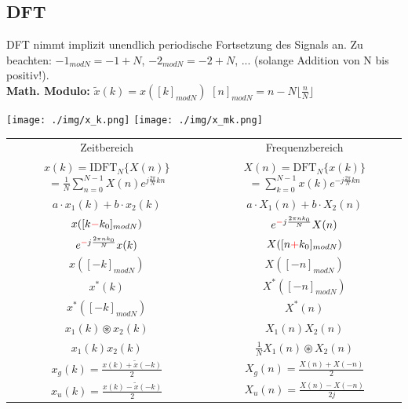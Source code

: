 \documentclass[10pt,a4paper]{article}
\begin{document}
\subsection{DFT}
DFT nimmt implizit unendlich periodische Fortsetzung des Signals an. Zu beachten: $-1_{modN}=-1 + N$, $-2_{modN}=-2+N$, ... (solange Addition von N bis positiv!).\\
\textbf{Math. Modulo:}
$\tilde{x}(k) = x([k]_{modN})$ 
$[n]_{modN}=n-N \lfloor \frac{n}{N} \rfloor$
  \begin{center}
      \texttt{[image: ./img/x\_k.png]}
      \texttt{[image: ./img/x\_mk.png]}
  \end{center}

\begin{center}
  \bgroup
  \def\arraystretch{1.5}
  \begin{tabular}{ | c | c | }
  \cline{1-2}
          \rowcolor{black!15}
          Zeitbereich & Frequenzbereich \\
  
  \cline{1-2}
          \shortstack{$x(k)=\text{IDFT}_N\{X(n)\}$ \\ $=\frac{1}{N}\displaystyle\sum\limits_{n=0}^{N-1}X(n)e^{j\frac{2\pi}{N}kn}$} &
          \shortstack{$X(n)=\text{DFT}_N\{x(k)\}$ \\ $=\displaystyle\sum\limits_{k=0}^{N-1}x(k)e^{-j\frac{2\pi}{N}kn}$} \\

  \cline{1-2}
          $a\cdot x_1(k)+ b\cdot x_2(k)$ & $a\cdot X_1(n) +b\cdot X_2(n)$ \\
  \cline{1-2}
          $x([k\textcolor{red}{-}k_0]_{modN})$ & $e^{\textcolor{red}{-}j\frac{2\pi nk_0}{N}} X(n)$\\
  \cline{1-2}
          $e^{\textcolor{red}{-}j\frac{2\pi nk_0}{N}} x(k)$ & $X([n\textcolor{red}{+}k_0]_{modN})$ \\  
  \cline{1-2}
          $x([-k]_{modN})$ & $X([-n]_{modN})$ \\  
  \cline{1-2}
          $x^*(k)$& $X^*([-n]_{modN})$\\ 
  \cline{1-2}
          $x^*([-k]_{modN})$& $X^*(n)$\\ 
  \cline{1-2}
          $x_1(k) \circledast x_2(k)$ & $X_1(n)X_2(n)$ \\  
  \cline{1-2}
          $x_1(k)x_2(k)$ & $\frac{1}{N} X_1(n) \circledast X_2(n)$ \\
  \cline{1-2}
          $x_g(k)=\frac{x(k)+\tilde{x}(-k)}{2}$ & $X_g(n)=\frac{X(n)+X(-n)}{2}$ \\
  \cline{1-2}
          $x_u(k)=\frac{x(k)-\tilde{x}(-k)}{2}$ & $X_u(n)=\frac{X(n)-X(-n)}{2j}$ \\
  \cline{1-2}
  \end{tabular}
  \egroup
\end{center}
\end{document}
